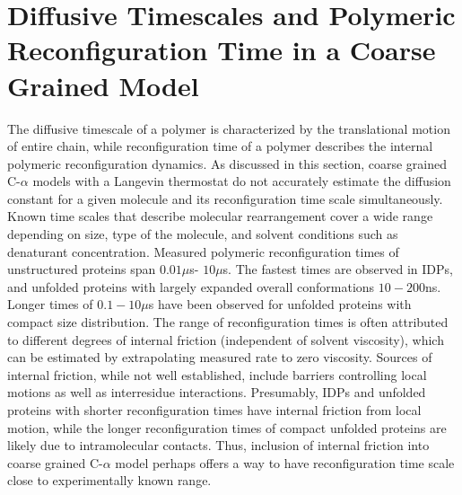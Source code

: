 \documentclass[../talant.diss.submit.tex]{subfiles}
\begin{document}
\section{\textbf{Diffusive Timescales and Polymeric Reconfiguration Time in a Coarse Grained Model}}\label{sect:gaussian_chain}
The diffusive timescale of a polymer is characterized by the translational motion of entire chain, while
reconfiguration time of a polymer describes the internal polymeric reconfiguration dynamics.
As discussed  in this section, coarse grained C-$\alpha$ models with a Langevin thermostat do not 
accurately estimate the diffusion constant for a given molecule and its
reconfiguration time scale simultaneously.
Known time scales that describe molecular rearrangement cover a wide
range depending on size, type of the molecule, and solvent conditions such as denaturant
concentration\cite{soranno:12}.
Measured polymeric reconfiguration times of unstructured proteins span $0.01\mu$s- $10\mu$s.
The fastest times are observed in IDPs, and unfolded proteins with largely expanded
overall conformations $10-200$ns. Longer times of $0.1-10\mu$s have been observed for unfolded
proteins with compact size distribution.
The range of reconfiguration times is often
attributed to different degrees of internal friction (independent of solvent viscosity),
which can be estimated by extrapolating measured rate to zero viscosity.
\cite{soranno:12,cellmer:08m,ansari:92r,liu:09t}
Sources of internal friction, while not well established, include barriers controlling
local motions as well as interresidue interactions. Presumably, IDPs and unfolded proteins
with shorter reconfiguration times have internal friction from local motion, while
the longer reconfiguration times of compact
unfolded proteins are likely due to intramolecular contacts. Thus, inclusion of internal friction into coarse grained C-$\alpha$
model perhaps offers a way to have reconfiguration time scale close to experimentally known range.
\end{document}
